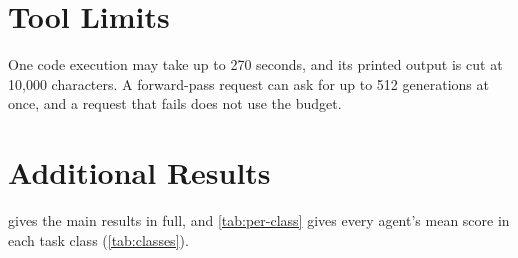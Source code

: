 \documentclass[11pt]{article}
\begin{document}
\section{Tool Limits}\label{app:prompts}
One code execution may take up to 270 seconds, and its printed output is cut at 10,000
characters. A forward-pass request can ask for up to 512 generations at once, and a request that
fails does not use the budget.

\section{Additional Results}\label{app:results}

 gives the main results in full, and \cref{tab:per-class} gives every agent's mean score in each task class (\cref{tab:classes}).

\begin{table}[!htbp]
  \centering
  \small
  \caption{Each agent's index is its mean score over the 168 cells (0 = baseline, 100 = perfect), with a 95\% bootstrap confidence interval; Read, Edit and Skill are the same mean
  over each family's cells. \emph{Solved} counts cells with a perfect score (100 after rounding), and \$/task is the
  mean API list price of one run. Each agent ran each cell once; refused runs score 0.}
  \label{tab:main}
  
\end{table}

\begin{table}[!htbp]
  \centering
  \footnotesize
  \setlength{\tabcolsep}{3.5pt}
  \caption{Mean score per task class, with the number of cells in each class. Agents are
  ordered as in \cref{tab:main}; Qwen-T and Qwen-N are Qwen3.8-27B with
  thinking on and off.}
  \label{tab:per-class}
  
\end{table}
\end{document}
